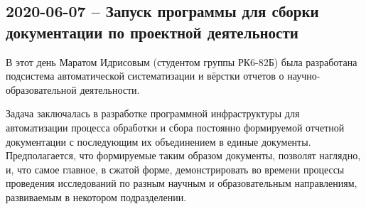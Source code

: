 \subsection{2020-06-07 -- Запуск программы для сборки документации по проектной деятельности}

В этот день Маратом Идрисовым (студентом группы РК6-82Б) была разработана подсистема автоматической систематизации и вёрстки отчетов о 
научно-образовательной деятельности. 

Задача заключалась в разработке программной инфраструктуры для автоматизации процесса обработки и сбора постоянно формируемой отчетной документации с последующим их объединением в единые документы. Предполагается, что формируемые таким образом документы, позволят наглядно, и, что самое главное, в сжатой форме, демонстрировать во времени процессы проведения исследований по разным научным и образовательным направлениям, развиваемым в некотором подразделении.

